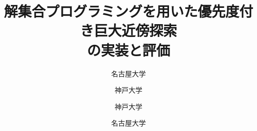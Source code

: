 \documentclass[uplatex,dvipdfmx,a4paper,twocolumn,base=11pt,jbase=11pt,ja=standard]{bxjsarticle}
\title{解集合プログラミングを用いた優先度付き巨大近傍探索\\の実装と評価}{ASP-based Implementation of Large Neighborhood Prioritized Search and its Evaluation}
\author{名古屋大学}{桑原 和也}{Kazuya Kuwahara, Nagoya University}
\author{神戸大学}{宋 剛秀}{Takehide Soh, Kobe University}
\author{神戸大学}{田村 直之}{Naoyuki Tamura, Kobe University}
\author{名古屋大学}{番原 睦則}{Mutsunori Banbara, Nagoya University}
\begin{document}
\maketitle


%
%
%
%

\small

\end{document}
